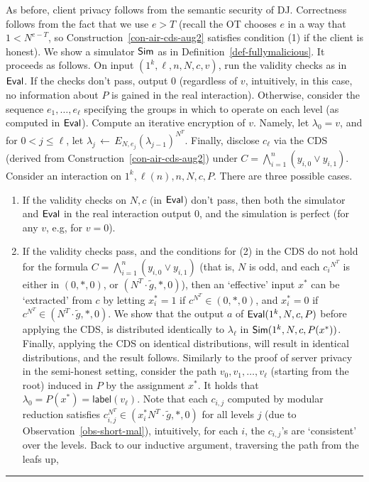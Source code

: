 \documentclass[11pt]{article}
\newenvironment{proof}{\noindent {\bf Proof:} \hspace{.677em}}%
                     {\qed}
\newcommand{\qed}{\hspace*{\fill}\rule{0.6em}{0.6em}}
\newcommand{\from}{{\,\leftarrow\,}}
\newcommand{\lab}{{\mathsf{label}}}
\newcommand{\eval}{{\sf Eval}}
\renewcommand{\sim}{{\sf Sim}}
\newcommand\ot{\mbox{OT}\xspace}
\newcommand{\encr}[2]{E_{#1}(#2)}
\newcommand{\opbrange}[3][,]{#2#1\ldots#1#3}
\newcommand{\samp}[2]{#1\from #2}
\begin{document}
\begin{proof}
As before, client privacy follows from the semantic security of DJ.
Correctness follows from the fact that we use $e>T$ (recall the \ot chooses $e$ in
a way that $1<N^{e-T}$, so Construction~\ref{con-air-cds-aug2} satisfies condition (1) if the client is honest).
We show a simulator $\sim$ as in Definition~\ref{def-fullymalicious}.
It proceeds as follows.
On input $(1^k,\ell,n,N,c,v)$, run the validity checks as in $\eval$.
If the checks don't pass, output $0$ (regardless of $v$, intuitively, in this case, no information
about $P$ is gained in the real interaction). Otherwise, consider the sequence $\opbrange{e_1}{e_{\ell}}$
specifying the groups in which to operate on each level (as computed in $\eval$).
Compute an iterative encryption of $v$. Namely, let $\lambda_0=v$, and for $0<j\leq \ell$, let $\samp{\lambda_j}{\encr{N,e_j}{\lambda_{j-1}}^{N^T}}$. Finally, disclose $c_{\ell}$ via the CDS  (derived from Construction~\ref{con-air-cds-aug2}) under $C=\bigwedge^n_{i=1}(y_{i,0}\vee y_{i,1})$. Consider an interaction on $1^k,\ell(n),n,N,c,P$.
There are three possible cases.
\begin{enumerate}
\item If the validity checks on $N,c$ (in $\eval$) don't pass, then both the simulator and
$\eval$ in the real interaction output 0, and the simulation is perfect (for any $v$, e.g, for $v=0$).
\item If the validity checks pass, and the conditions for (2) in the CDS do not
hold for the formula $C=\bigwedge^n_{i=1}(y_{i,0}\vee y_{i,1})$
(that is, $N$ is odd, and each ${c_i}^{N^T}$ is either in $(0,*,0)$, or $(N^T\cdot \tilde{g},*,0)$), then an `effective' input $x^*$ can be `extracted' from $c$ by letting $x^*_i=1$ if $c^{N^T}\in(0,*,0)$, and $x^*_i=0$ if $c^{N^T}\in(N^T\cdot \tilde{g},*,0)$. We show that the output $a$ of $\eval(1^k,N,c,P)$ before applying the CDS, is distributed identically to $\lambda_{\ell}$ in $\sim(1^k,N,c,P(x^*))$.
Finally, applying the CDS on identical distributions, will result in identical distributions, and the result follows. Similarly to the proof of server privacy in the semi-honest setting, consider the path $v_0,v_1,\ldots,v_\ell$ (starting from the root) induced in $P$ by the assignment $x^*$. It holds that $\lambda_0=P(x^*)=\lab(v_\ell)$.
Note that each $c_{i,j}$ computed by modular reduction satisfies $c^{N^T}_{i,j}\in(x^*_iN^T\cdot \tilde{g},*,0)$
for all levels $j$ (due to Observation~\ref{obs-short-mal}), intuitively, for each $i$, the $c_{i,j}$'s are `consistent' over the levels. Back to our inductive argument, traversing the path from the leafs up,

\end{enumerate}
\end{proof}
\end{document}
